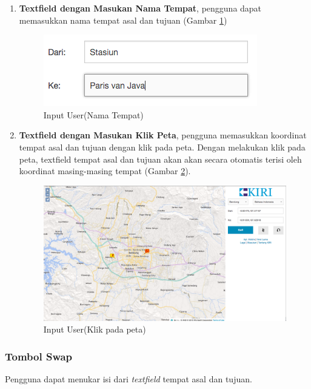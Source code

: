 \begin{enumerate}
	\item \textbf{Textfield dengan Masukan Nama Tempat}, pengguna dapat memasukkan nama tempat asal dan tujuan (Gambar \ref{fig:4_KIRI_textfield_nama})
	
	\begin{figure}[H]
		\centering
		\includegraphics[scale=0.5]{Gambar/KIRI-textfield-nama}
		\caption{Input User(Nama Tempat)} 
		\label{fig:4_KIRI_textfield_nama}
	\end{figure}
	
	\item \textbf{Textfield dengan Masukan Klik Peta}, pengguna memasukkan koordinat tempat asal dan tujuan dengan klik pada peta. Dengan melakukan klik pada peta, textfield tempat asal dan tujuan akan akan secara otomatis terisi oleh koordinat masing-masing tempat (Gambar \ref{fig:4_KIRI_textfield_koord}).
	
	\begin{figure}[H]
		\centering
		\includegraphics[scale=0.3]{Gambar/KIRI-textfield-koord}
		\caption{Input User(Klik pada peta)} 
		\label{fig:4_KIRI_textfield_koord}
	\end{figure}
	

\end{enumerate}

\subsubsection{Tombol Swap}
Pengguna dapat menukar isi dari \textit{textfield} tempat asal dan tujuan. 

